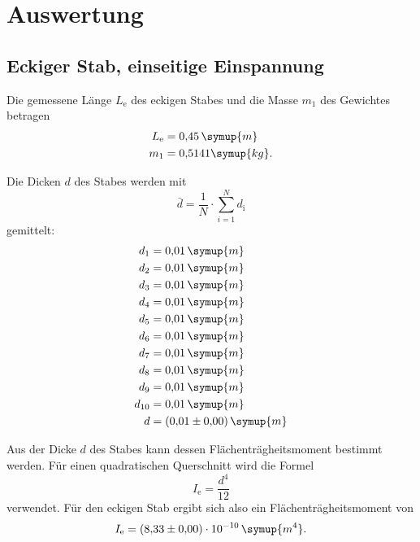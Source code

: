 \section{Auswertung}


\subsection{Eckiger Stab, einseitige Einspannung}
Die gemessene Länge $L_{\text{e}}$ des eckigen Stabes und die Masse $m_1$ des Gewichtes betragen
\begin{equation*}
\begin{aligned}
L_{\text{e}} &= 0{,}45\, \symup{m} \\
m_1 &= 0{,}5141 \symup{kg}.
\end{aligned}
\end{equation*}

Die Dicken $d$ des Stabes werden mit 
\begin{equation}
\bar{d} = \frac{1}{N}\cdot \sum_{i=1}^N d_{\text{i}}
\label{eqn:mittelwert}
\end{equation}
gemittelt:
\begin{equation*}
\begin{aligned}
d_1 &= 0{,}01\, \symup{m} \\
d_2 &= 0{,}01\, \symup{m} \\
d_3 &= 0{,}01\, \symup{m} \\
d_4 &= 0{,}01\, \symup{m} \\
d_5 &= 0{,}01\, \symup{m} \\
d_6 &= 0{,}01\, \symup{m} \\
d_7 &= 0{,}01\, \symup{m} \\
d_8 &= 0{,}01\, \symup{m} \\
d_9 &= 0{,}01\, \symup{m} \\
d_{10} &= 0{,}01\, \symup{m} \\
d &= (0{,}01 \pm 0{,}00)\, \symup{m}
\end{aligned}
\end{equation*}

Aus der Dicke $d$ des Stabes kann dessen Flächenträgheitsmoment bestimmt werden. Für einen quadratischen Querschnitt wird die Formel \cite{flaeche}
\begin{equation*}
I_{\text{e}} = \frac{d^4}{12}
\end{equation*}
verwendet. Für den eckigen Stab ergibt sich also ein Flächenträgheitsmoment von
\begin{equation*}
I_{\text{e}} = (8{,}33 \pm 0{,}00)\cdot10^{-10}\,\symup{m^4}.
\end{equation*}

